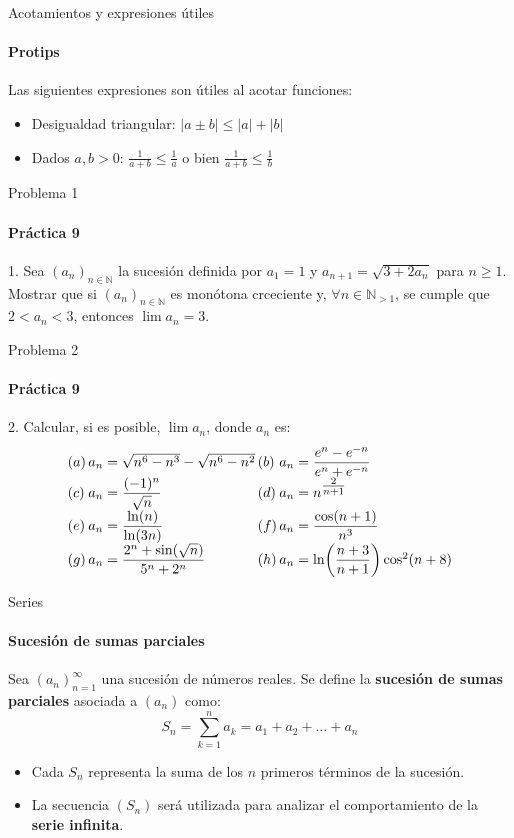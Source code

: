 \documentclass{plantillaPPT}
\begin{document}
\primeraDiapo

\begin{frame}{Acotamientos y expresiones útiles}
\framesubtitle{Protips}

Las siguientes expresiones son útiles al acotar funciones:
\vspace{5pt}
\begin{itemize}
    \item Desigualdad triangular: \(|a\pm b| \leq |a|+|b|\)
    \vspace{5pt}
    \item Dados \(a,b>0\): \(\frac{1}{a+b}\leq\frac{1}{a}\) o bien \(\frac{1}{a+b}\leq\frac{1}{b}\)
\end{itemize}
\end{frame}

\begin{frame}{Problema 1}
\framesubtitle{Práctica 9}

1. Sea $(a_n)_{n\in\mathbb{N}}$ la sucesión definida por $a_1 = 1$ y $a_{n+1} = \sqrt{3+2a_n}$ para $n\geq1$. Mostrar que si $(a_n)_{n\in\mathbb{N}}$ es monótona crceciente y, $\forall n\in\mathbb{N}_{>1}$, se cumple que $2<a_n<3$, entonces $\displaystyle \lim a_n = 3$. 
    
\end{frame}

\begin{frame}{Problema 2}
\framesubtitle{Práctica 9}

2. Calcular, si es posible, $\displaystyle \lim a_n$, donde $a_n$ es:
\vspace{-0.4cm}
{
\renewcommand{\arraystretch}{2} %
\[
\begin{array}{@{}l@{}l@{}c@{}l@{}l@{}}
(a)\,&a_n=\sqrt{n^6-n^3}-\sqrt{n^6-n^2}&\,&(b)&a_n=\dfrac{e^n-e^{-n}}{e^n+e^{-n}}\\
(c)\,&a_n=\dfrac{(-1)^n}{\sqrt{n}}&\,&(d)\,&a_n=n^{\tfrac{2}{n+1}}\\
(e)\,&a_n=\dfrac{\ln(n)}{\ln(3n)}&\,&(f)\,&a_n=\dfrac{\cos(n+1)}{n^3}\\
(g)\,&a_n=\dfrac{2^n+\sin(\sqrt{n})}{5^n+2^n}&\,&(h)\,&a_n=\ln\!\left(\dfrac{n+3}{n+1}\right)\cos^2(n+8)
\end{array}
\]
}
\end{frame}

\begin{frame}{Series}
\framesubtitle{Sucesión de sumas parciales}

\begin{definicion}
    Sea \((a_n)_{n=1}^{\infty}\) una sucesión de números reales. 
    Se define la \textbf{sucesión de sumas parciales} asociada a \((a_n)\) como:
    \[
    S_n = \sum_{k=1}^{n} a_k = a_1 + a_2 + \dots + a_n
    \]
    \begin{itemize}
        \item Cada \(S_n\) representa la suma de los \(n\) primeros términos de la sucesión.
        \item La secuencia \((S_n)\) será utilizada para analizar el comportamiento de la \textbf{serie infinita}.
    \end{itemize}
\end{definicion}
\end{frame}
\end{document}
